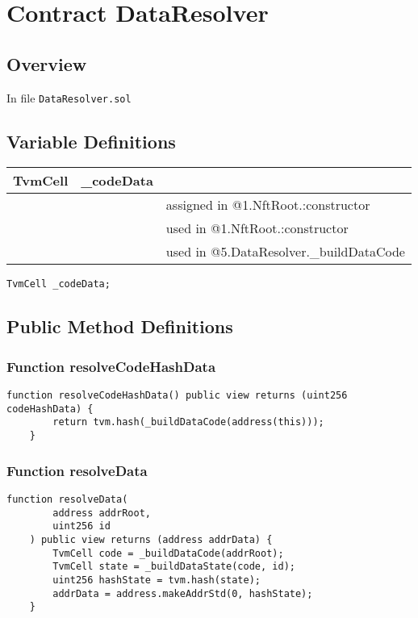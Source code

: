 
\chapter{Contract DataResolver}

\minitoc

\section{Overview}


In file {\tt DataResolver.sol}

\section{Variable Definitions}


\ifsoltables
\noindent\begin{tabular}{|l|l|p{5cm}|}\hline
TvmCell & \_{}codeData &  \\\hline
 & & assigned in @1.NftRoot.:constructor\\\hline
 & & used in @1.NftRoot.:constructor\\\hline
 & & used in @5.DataResolver.\_{}buildDataCode\\\hline
\end{tabular}
\fi


\begin{lstlisting}[firstnumber=11]
    TvmCell _codeData;
\end{lstlisting}

\section{Public Method Definitions}


\subsection{Function resolveCodeHashData}

\begin{lstlisting}[firstnumber=13]
    function resolveCodeHashData() public view returns (uint256 codeHashData) {
        return tvm.hash(_buildDataCode(address(this)));
    }
\end{lstlisting}

\subsection{Function resolveData}

\begin{lstlisting}[firstnumber=17]
    function resolveData(
        address addrRoot,
        uint256 id
    ) public view returns (address addrData) {
        TvmCell code = _buildDataCode(addrRoot);
        TvmCell state = _buildDataState(code, id);
        uint256 hashState = tvm.hash(state);
        addrData = address.makeAddrStd(0, hashState);
    }
\end{lstlisting}

